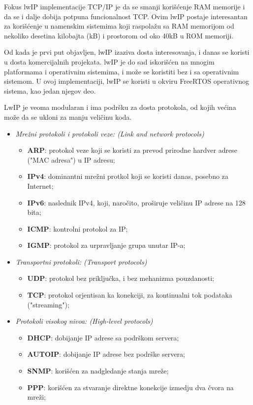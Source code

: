 \documentclass[a4paper,12pt, master]{etf}
\begin{document}
	Fokus lwIP implementacije TCP/IP je da se smanji kori\v{s}\'{c}enje RAM
	memorije i da se i dalje dobija potpuna funcionalnost TCP\@. Ovim lwIP
	postaje interesantan za kori\v{s}\'{c}enje u namenskim sistemima koji
	raspola\v{z}u sa RAM memorijom od nekoliko desetina kilobajta (kB) i
	prostorom od oko 40kB u ROM memoriji.

	Od kada je prvi put objavljen, lwIP izaziva dosta interesovanja, i danas se
	koristi u dosta	komercijalnih projekata\@. lwIP je do sad
	iskori\v{s}\'{c}en na mnogim platformama i operativnim sistemima, i
	mo\v{z}e se koristiti bez i sa operativnim sistemom. U ovoj implementaciji,
	lwIP se koristi u okviru FreeRTOS operativnog sistema, kao jedan njegov deo.

	LwIP je veoma modularan i ima podr\v{s}ku za dosta protokola, od kojih
	ve\'{c}ina mo\v{z}e da se ukloni za manju veli\v{c}inu koda.

	\begin{itemize}
		\item \textit{Mre\v{z}ni protokoli i protokoli veze: (Link and network
		protocols)}
		\begin{itemize}
			\item \textbf{ARP}: protokol veze koji se koristi za prevod
			prirodne hardver adrese ("MAC adresa") u IP adresu;
			\item \textbf{IPv4}: dominantni mre\v{z}ni protkol koji se koristi
			danas, posebno za Internet;
			\item \textbf{IPv6}: naslednik IPv4, koji, naro\v{c}ito,
			pro\v{s}iruje veli\v{c}inu IP adrese na 128 bita;
			\item \textbf{ICMP}: kontrolni protokol za IP;
			\item \textbf{IGMP}: protokol za urpravljanje grupa unutar IP-a;
		\end{itemize}
		\item \textit{Transportni protokoli: (Transport protocols)}
			\begin{itemize}
				\item \textbf{UDP}: protokol bez priklju\v{c}ka, i bez
				mehanizma pouzdanosti;
				\item \textbf{TCP}: protokol orjentisan ka konekciji, za
				kontinualni tok	podataka ("streaming");
			\end{itemize}
		\item \textit{Protokoli visokog nivoa: (High-level protocols)}
			\begin{itemize}
				\item \textbf{DHCP}: dobijanje IP adrese sa podr\v{s}kom
				servera;
				\item \textbf{AUTOIP}: dobijanje IP adrese bez podr\v{s}ke
				servera;
				\item \textbf{SNMP}: kori\v{s}\'{c}en za nadgledanje stanja
				mre\v{z}e;
				\item \textbf{PPP}: kori\v{s}\'{c}en za stvaranje direktne
				konekcije izmedju dva \v{c}vora	na mre\v{z}i;
			\end{itemize}
	\end{itemize}
\end{document}
